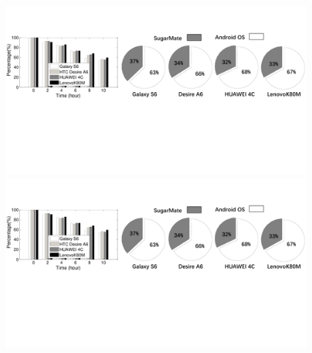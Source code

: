 \begin{figure}[h]
  \centering
  \begin{minipage}{0.35\columnwidth}
  \centering
  \includegraphics[width=1\columnwidth]{./img/battery_trace.pdf}
  \caption{}
  \label{fig:battery_lifetime}
  \end{minipage}
  \hspace{0.05\columnwidth}
  \begin{minipage}{0.55\columnwidth}
  \centering
  \includegraphics[width=1\columnwidth]{./img/energy_overhead.pdf}
  \caption{}
  \label{fig:battery_consumption}
  \end{minipage}%
\end{figure}


